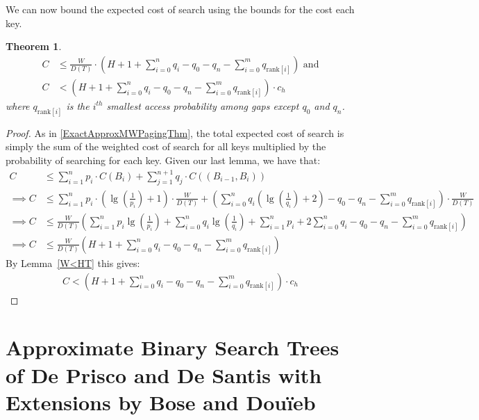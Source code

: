 \documentclass[letterpaper,12pt,titlepage,oneside,final]{book}
\theoremstyle{plain}
\newtheorem{thm}{Theorem}[section]
\begin{document}
We can now bound the expected cost of search using the bounds for the cost each key.

\begin{thm} \label{ApproxMWPagingThm}
\begin{align*}
C &\leq  \frac{W}{D(T)} \cdot  \left(H + 1 + \sum_{i=0}^n q_i - q_0 - q_n - \sum_{i=0}^m q_{\text{rank}[i]} \right) \text{ and}\\
C &< \left(H + 1 + \sum_{i=0}^n q_i - q_0 - q_n - \sum_{i=0}^m q_{\text{rank}[i]} \right) \cdot  c_h
\end{align*}
where $q_{\text{rank}[i]}$ is the $i^{th}$ smallest access probability among gaps except $q_0$ and $q_n$.
\end{thm}

\begin{proof}
As in \ref{ExactApproxMWPagingThm}, the total expected cost of search is simply the sum of the weighted cost of search for all keys multiplied by the probability of searching for each key. Given our last lemma, we have that:
\begin{align*}
C &\leq \sum_{i=1}^{n} p_i\cdot C(B_i) + \sum_{j=1}^{n+1} q_j\cdot C((B_{i-1},B_i)) \\
\implies C &\leq \sum_{i=1}^{n} p_i\cdot (\lg(\frac{1}{p_i})+1)\cdot \frac{W}{D(T)} + \left(\sum_{i=0}^{n} q_i(\lg(\frac{1}{q_i})+2) - q_0 - q_n -  \sum_{i=0}^m q_{\text{rank}[i]} \right)\cdot \frac{W}{D(T)} \\
\implies C &\leq \frac{W}{D(T)} \left(\sum_{i=1}^{n} p_i\lg(\frac{1}{p_i}) + \sum_{i=0}^{n} q_i\lg(\frac{1}{q_i}) + \sum_{i=1}^{n} p_i + 2\sum_{i=0}^{n} q_i - q_0 - q_n - \sum_{i=0}^m q_{\text{rank}[i]} \right) \\
\implies C &\leq  \frac{W}{D(T)} \left(H + 1 + \sum_{i=0}^n q_i - q_0 - q_n - \sum_{i=0}^m q_{\text{rank}[i]} \right)
\end{align*}
By Lemma~\ref{W<HT} this gives:
\begin{align*}
C < \left(H + 1 + \sum_{i=0}^n q_i - q_0 - q_n - \sum_{i=0}^m q_{\text{rank}[i]} \right) \cdot  c_h
\end{align*}

\end{proof}


\section{Approximate Binary Search Trees of De Prisco and De Santis with Extensions by Bose and Dou\"{i}eb} \label{sec:deBST}
\end{document}
